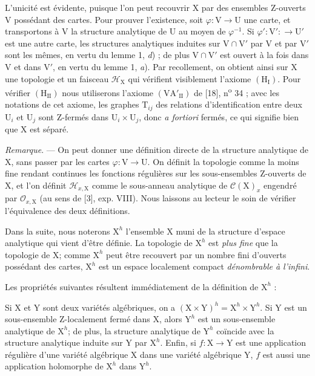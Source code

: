L'unicité est évidente, puisque l'on peut recouvrir $\mathrm{X}$ par des ensembles Z-ouverts $\mathrm{V}$ possédant des cartes. Pour prouver l'existence, soit $\varphi : \mathrm{V} \to \mathrm{U}$ une carte, et transportons à $\mathrm{V}$ la structure analytique de $\mathrm{U}$ au moyen de $\varphi^{-1}$. Si $\varphi' : \mathrm{V}' : \to \mathrm{U}'$ est une autre carte, les structures analytiques induites sur $\mathrm{V} \cap \mathrm{V}'$ par $\mathrm{V}$ et par $\mathrm{V}'$ sont les mêmes, en vertu du lemme 1, \textit{d}) ; de plus $\mathrm{V} \cap \mathrm{V}'$ est ouvert à la fois dans $\mathrm{V}$ et dans $\mathrm{V}'$, en vertu du lemme 1, \textit{a}). Par recollement, on obtient ainsi sur $\mathrm{X}$ une topologie et un faisceau $\mathcal{H}_{\mathrm{X}}$ qui vérifient visiblement l'axiome $(\mathrm{H}_{\mathrm{I}})$. Pour vérifier $(\mathrm{H}_{\mathrm{II}})$ nous utiliserons l'axiome $(\mathrm{VA}'_{\mathrm{II}})$ de [18], n\textsuperscript{o} 34 ; avec les notations de cet axiome, les graphes $\mathrm{T}_{ij}$ des relations d'identification entre deux $\mathrm{U}_i$ et $\mathrm{U}_j$ sont Z-fermés dans $\mathrm{U}_i \times \mathrm{U}_j$, donc \textit{a fortiori} fermés, ce qui signifie bien que $\mathrm{X}$ est séparé.

\textit{Remarque}. --- On peut donner une définition directe de la structure analytique de $\mathrm{X}$, sans passer par les cartes $\varphi : \mathrm{V} \to \mathrm{U}$.
%
%
%
On définit la topologie comme la moins fine rendant continues les fonctions régulières sur les sous-ensembles Z-ouverts de $\mathrm{X}$, et l'on définit $\mathcal{H}_{x,\mathrm{X}}$ comme le sous-anneau analytique de $\mathcal{C}(\mathrm{X})_x$ engendré par $\mathcal{O}_{x,\mathrm{X}}$ (au sens de [3], exp. VIII). Nous laissons au lecteur le soin de vérifier l'équivalence des deux définitions.

Dans la suite, nous noterons $\mathrm{X}^h$ l'ensemble $\mathrm{X}$ muni de la structure d'espace analytique qui vient d'être définie. La topologie de $\mathrm{X}^h$ est \textit{plus fine} que la topologie de $\mathrm{X}$; comme $\mathrm{X}^h$ peut être recouvert par un nombre fini d'ouverts possédant des cartes, $\mathrm{X}^h$ est un espace localement compact \textit{dénombrable à l'infini}.

Les propriétés suivantes résultent immédiatement de la définition de $\mathrm{X}^h$ :

Si $\mathrm{X}$ et $\mathrm{Y}$ sont deux variétés algébriques, on a $(\mathrm{X} \times \mathrm{Y})^h = \mathrm{X}^h \times \mathrm{Y}^h$. Si $\mathrm{Y}$ est un sous-ensemble Z-localement fermé dans $\mathrm{X}$, alors $\mathrm{Y}^h$ est un sous-ensemble analytique de $\mathrm{X}^h$; de plus, la structure analytique de $\mathrm{Y}^h$ coïncide avec la structure analytique induite sur $\mathrm{Y}$ par $\mathrm{X}^h$. Enfin, si $f : \mathrm{X} \to \mathrm{Y}$ est une application régulière d'une variété algébrique $\mathrm{X}$ dans une variété algébrique $\mathrm{Y}$, $f$ est aussi une application holomorphe de $\mathrm{X}^h$ dans $\mathrm{Y}^h$.


